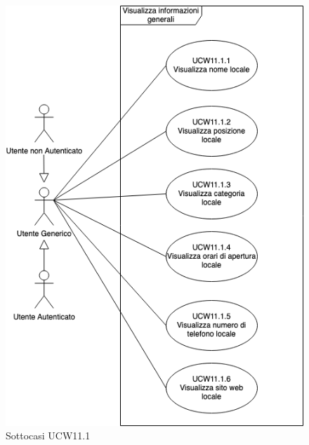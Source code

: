 \begin{figure}[H]
	\centering
	\includegraphics[scale=0.5]{UC_images/UCW11-1.png} 
	\caption{Sottocasi UCW11.1}
\end{figure}	

